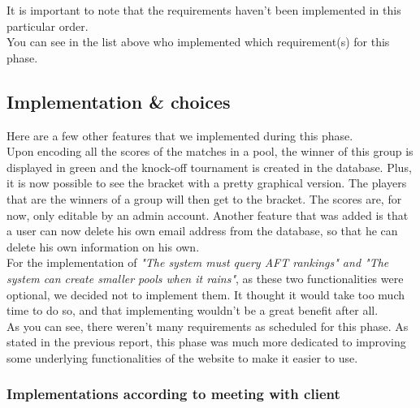 \documentclass[a4paper, 12pt]{article}
\begin{document}
It is important to note that the requirements haven't been implemented in this particular order.\\

You can see in the list above who implemented which requirement(s) for this phase. 

\subsection{Implementation \& choices}

Here are a few other features that we implemented during this phase. \\

Upon encoding all the scores of the matches in a pool, the winner of this group is displayed in green and the knock-off tournament is created in the database. Plus, it is now possible to see the bracket with a pretty graphical version. The players that are the winners of a group will then get to the bracket. The scores are, for now, only editable by an admin account. Another feature that was added is that a user can now delete his own email address from the database, so that he can delete his own information on his own.\\

For the implementation of \textit{"The system must query AFT rankings" and "The system can create smaller pools when it rains"}, as these two functionalities were optional, we decided not to implement them. It thought it would take too much time to do so, and that implementing wouldn't be a great benefit after all.\\

As you can see, there weren't many requirements as scheduled for this phase. As stated in the previous report, this phase was much more dedicated to improving some underlying functionalities of the website to make it easier to use.

\subsubsection*{Implementations according to meeting with client}
\end{document}
